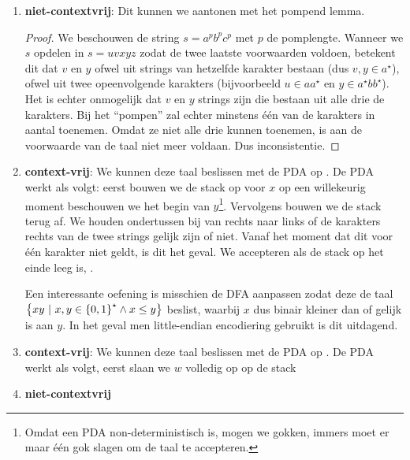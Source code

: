 \documentclass[a4paper]{article}
\begin{document}
\begin{question}
\begin{answer}
\begin{enumerate}
\begin{proof}
\end{proof}
\item \textbf{niet-contextvrij}: Dit kunnen we aantonen met het pompend lemma.
\begin{proof}
We beschouwen de string $s=a^pb^pc^p$ met $p$ de pomplengte. Wanneer we $s$ opdelen in $s=uvxyz$ zodat de twee laatste voorwaarden voldoen, betekent dit dat $v$ en $y$ ofwel uit strings van hetzelfde karakter bestaan (dus $v,y\in a^{\star}$), ofwel uit twee opeenvolgende karakters (bijvoorbeeld $u\in aa^{\star}$ en $y\in a^{\star}bb^{\star}$). Het is echter onmogelijk dat $v$ en $y$ strings zijn die bestaan uit alle drie de karakters. Bij het ``pompen'' zal echter minstens \'e\'en van de karakters in aantal toenemen. Omdat ze niet alle drie kunnen toenemen, is aan de voorwaarde van de taal niet meer voldaan. Dus inconsistentie.
\end{proof}
\item \textbf{context-vrij}: We kunnen deze taal beslissen met de PDA op \figref{}. De PDA werkt als volgt: eerst bouwen we de stack op voor $x$ op een willekeurig moment beschouwen we het begin van $y$\footnote{Omdat een PDA non-deterministisch is, mogen we gokken, immers moet er maar \'e\'en gok slagen om de taal te accepteren.}. Vervolgens bouwen we de stack terug af. We houden ondertussen bij van rechts naar links of de karakters rechts van de twee strings gelijk zijn of niet. Vanaf het moment dat dit voor \'e\'en karakter niet geldt, is dit het geval. We accepteren als de stack op het einde leeg is, .
\begin{note}
Een interessante oefening is misschien de DFA aanpassen zodat deze de taal $\left\{ xy\ |\ x,y\in\left\{ 0,1 \right\}^{\star}\wedge x\leq y \right\}$ beslist, waarbij $x$ dus binair kleiner dan of gelijk is aan $y$. In het geval men little-endian encodiering gebruikt is dit uitdagend.
\end{note}
\item \textbf{context-vrij}: We kunnen deze taal beslissen met de PDA op \figref{}. De PDA werkt als volgt, eerst slaan we $w$ volledig op op de stack
\item \textbf{niet-contextvrij}
\end{enumerate}
\end{answer}
\end{question}
\end{document}
